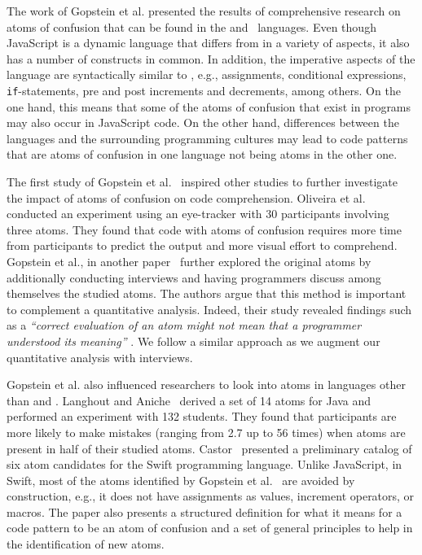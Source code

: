 The work of Gopstein et al. \cite{DBLP:conf/sigsoft/GopsteinIYDZYC17} presented the results of comprehensive research on atoms of confusion that can be found in the \clang and \cpplang~languages. Even though JavaScript is a dynamic language that differs from \clang in a variety of aspects, it also has a number of constructs in common. In addition, the imperative aspects of the language are syntactically similar to \clang, e.g., assignments, conditional expressions, \texttt{if}-statements, pre and post increments and decrements, among others. On the one hand, this means that some of the atoms of confusion that exist in \clang programs may also occur in JavaScript code. On the other hand, differences between the languages and the surrounding programming cultures may lead to code patterns that are atoms of confusion in one language not being atoms in the other one.

The first study of Gopstein et al.~\cite{DBLP:conf/sigsoft/GopsteinIYDZYC17} inspired other studies to further investigate the impact of atoms of confusion on code comprehension.
Oliveira et al.~\cite{TheEyesDoNotLie} conducted an experiment using an eye-tracker with 30 participants involving three atoms.
They found that code with atoms of confusion requires more time from participants to predict the output and more visual effort to comprehend.
Gopstein et al., in another paper~\cite{ThinkingAloud} further explored the original atoms by additionally conducting interviews and having programmers discuss among themselves the studied atoms.
The authors argue that this method is important to complement a quantitative analysis.
Indeed, their study revealed findings such as a \textit{``correct evaluation of an atom might not mean that a programmer understood its meaning''
}. We follow a similar approach as we augment our quantitative analysis with interviews.

Gopstein et al. also influenced researchers to look into atoms in languages other than \clang and \cpplang.
Langhout and Aniche~\cite{Langhout:2021:ACJ} derived a set of 14 atoms for Java and performed an experiment with 132 students. They found that participants are more likely to make mistakes (ranging from 2.7 up to 56 times) when atoms are present in half of their studied atoms.
Castor~\cite{castor2018} presented a preliminary catalog of six atom candidates for the Swift programming language. Unlike JavaScript, in Swift, most of the atoms identified by Gopstein et al.~\cite{DBLP:conf/sigsoft/GopsteinIYDZYC17} are avoided by construction, e.g., it does not have assignments as values, increment operators, or macros. The paper also presents a structured definition for what it means for a code pattern to be an atom of confusion and a set of general principles to help in the identification of new atoms.

